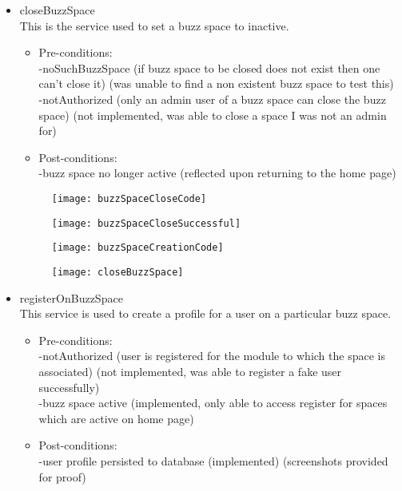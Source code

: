\begin {itemize}
\begin {itemize}
\item {closeBuzzSpace}\\
This is the service used to set a buzz space to inactive.
\begin {itemize}
\item Pre-conditions: \\
-noSuchBuzzSpace (if buzz space to be closed does not exist then one can't close it) (was unable to find a non existent buzz space to test this)\\
        -notAuthorized (only an admin user of a buzz space can close the buzz space) (not implemented, was able to close a space I was not an admin for)\\
\item Post-conditions:\\
-buzz space no longer active (reflected upon returning to the home page)\\
\end{itemize}

\begin{figure}[h!]
  \centering
    \texttt{[image: buzzSpaceCloseCode]} 
\end{figure}

\begin{figure}[h!]
  \centering
    \texttt{[image: buzzSpaceCloseSuccessful]} 
\end{figure}

\begin{figure}[h!]
  \centering
    \texttt{[image: buzzSpaceCreationCode]} 
\end{figure}

\begin{figure}[h!]
  \centering
    \texttt{[image: closeBuzzSpace]} 
\end{figure}

\item {registerOnBuzzSpace}\\
This service is used to create a profile for a user on a particular buzz space.
\begin {itemize}
\item Pre-conditions: \\
-notAuthorized (user is registered for the module to which the space is associated) (not implemented, was able to register a fake user successfully)\\
        -buzz space active (implemented, only able to access register for spaces which are active on home page)\\
\item Post-conditions: \\
 -user profile persisted to database (implemented) (screenshots provided for proof)\\
\end{itemize}


\end{itemize}
\end{itemize}
